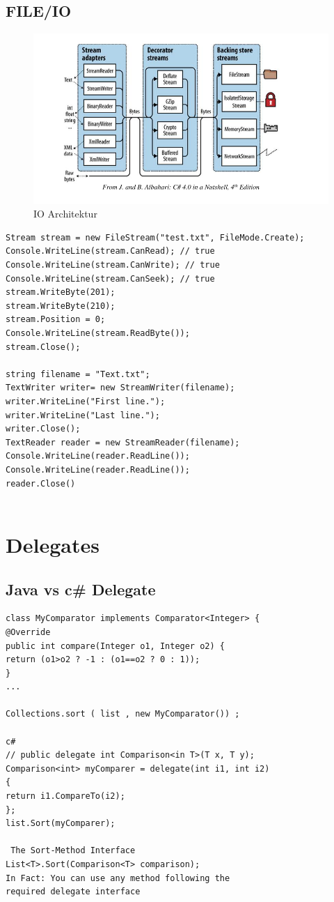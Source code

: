 \documentclass[a4paper,10pt]{scrartcl}
\begin{document}
\subsection{FILE/IO}
\begin{figure}[h]
 \centering
 \includegraphics[scale=0.5]{./ioarch.png}
 \caption{IO Architektur}
\end{figure}

\begin{lstlisting}[caption=Stream Beispiele]
 Stream stream = new FileStream("test.txt", FileMode.Create);
Console.WriteLine(stream.CanRead); // true
Console.WriteLine(stream.CanWrite); // true
Console.WriteLine(stream.CanSeek); // true
stream.WriteByte(201);
stream.WriteByte(210);
stream.Position = 0;
Console.WriteLine(stream.ReadByte());
stream.Close();

string filename = "Text.txt";
TextWriter writer= new StreamWriter(filename);
writer.WriteLine("First line.");
writer.WriteLine("Last line.");
writer.Close();
TextReader reader = new StreamReader(filename);
Console.WriteLine(reader.ReadLine());
Console.WriteLine(reader.ReadLine());
reader.Close()


\end{lstlisting}

\section{Delegates}

\subsection{Java vs c\# Delegate}
\begin{lstlisting}[basicstyle=\footnotesize\ttfamily]
 class MyComparator implements Comparator<Integer> {
@Override
public int compare(Integer o1, Integer o2) {
return (o1>o2 ? -1 : (o1==o2 ? 0 : 1));
}
...

Collections.sort ( list , new MyComparator()) ;

c#
// public delegate int Comparison<in T>(T x, T y);
Comparison<int> myComparer = delegate(int i1, int i2)
{
return i1.CompareTo(i2);
};
list.Sort(myComparer);

 The Sort-Method Interface
List<T>.Sort(Comparison<T> comparison);
In Fact: You can use any method following the
required delegate interface

\end{lstlisting}
\end{document}
